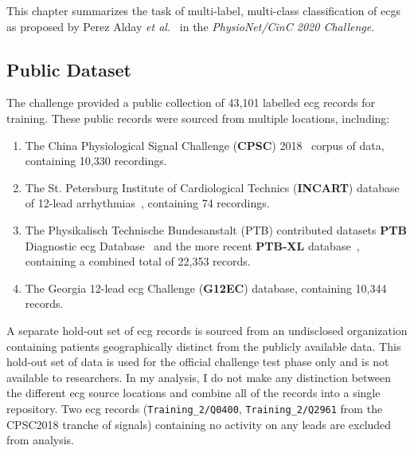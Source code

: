 \documentclass[\main/thesis.tex]{subfiles}
\begin{document}
This chapter summarizes the task of multi-label, multi-class classification of \gls{ecg}s as proposed by Perez Alday \emph{et al.}~\cite{physionet_challenge_2020} in the \emph{PhysioNet/CinC 2020 Challenge}.

\subsection{Public Dataset}
The challenge provided a public collection of 43,101 labelled \gls{ecg} records for training.
These public records were sourced from multiple locations, including:

\begin{enumerate}
    \item The China Physiological Signal Challenge (\textbf{CPSC}) 2018~\cite{liu_open_2018} corpus of data, containing 10,330 recordings.
    \item The St. Petersburg Institute of Cardiological Technics (\textbf{INCART}) database of 12-lead arrhythmias~\cite{tihonenko2008st}, containing 74 recordings.
    \item The Physikalisch Technische Bundesanstalt (PTB) contributed datasets \textbf{PTB} Diagnostic \gls{ecg} Database~\cite{NutzungderEKGSignaldatenbankCARDIODATderPTBberdasInternet} and the more recent \textbf{PTB-XL} database~\cite{wagner_ptb-xl_2020}, containing a combined total of 22,353 records.
    \item The Georgia 12-lead \gls{ecg} Challenge (\textbf{G12EC}) database, containing 10,344 records.
\end{enumerate}

A separate hold-out set of \gls{ecg} records is sourced from an undisclosed organization containing patients geographically distinct from the publicly available data.
This hold-out set of data is used for the official challenge test phase only and is not available to researchers.
In my analysis, I do not make any distinction between the different \gls{ecg} source locations and combine all of the records into a single repository.
Two \gls{ecg} records (\texttt{Training\_2/Q0400}, \texttt{Training\_2/Q2961} from the CPSC2018 tranche of signals) containing no activity on any leads are excluded from analysis.
\end{document}
